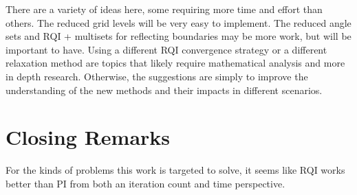 There are a variety of ideas here, some requiring more time and effort than others. The reduced grid levels will be very easy to implement. The reduced angle sets and RQI + multisets for reflecting boundaries may be more work, but will be important to have. Using a different RQI convergence strategy or a different relaxation method are topics that likely require mathematical analysis and more in depth research. Otherwise, the suggestions are simply to improve the understanding of the new methods and their impacts in different scenarios.  

\section{Closing Remarks}



For the kinds of problems this work is targeted to solve, it seems like RQI works better than PI from both an iteration count and time perspective. 






